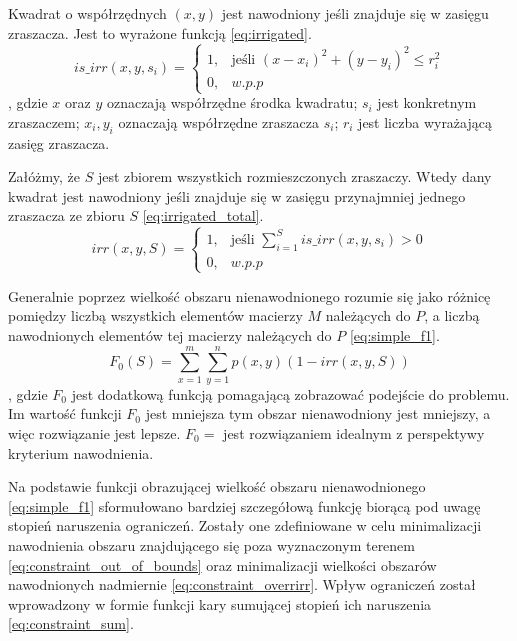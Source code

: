 \documentclass[twoside]{iisthesis}
\begin{document}
Kwadrat o współrzędnych $(x,y)$ jest nawodniony jeśli znajduje się w zasięgu zraszacza. Jest to wyrażone funkcją \eqref{eq:irrigated}.
\begin{equation}\label{eq:irrigated}
	is\_irr(x, y, s_{i}) = \begin{cases}
							1,& \text{jeśli } (x - x_{i})^{2} + (y - y_{i})^2 \leq r_{i}^{2}\\
							0,& w.p.p
						  \end{cases}
\end{equation}
, gdzie $x$ oraz $y$ oznaczają współrzędne środka kwadratu; $s_{i}$ jest konkretnym zraszaczem; $x_{i}, y_{i}$ oznaczają współrzędne zraszacza $s_{i}$; $r_{i}$ jest liczba wyrażającą zasięg zraszacza.

Załóżmy, że $S$ jest zbiorem wszystkich rozmieszczonych zraszaczy. Wtedy dany kwadrat jest nawodniony jeśli znajduje się w zasięgu przynajmniej jednego zraszacza ze zbioru $S$ \eqref{eq:irrigated_total}.
\begin{equation}\label{eq:irrigated_total}
	irr(x, y, S) = \begin{cases}
				   	1,& \text{jeśli } \sum_{i=1}^{S} is\_irr(x,y,s_{i}) > 0 \\
				   	0,& w.p.p			   	
				   \end{cases}
\end{equation}

Generalnie poprzez wielkość obszaru nienawodnionego rozumie się jako różnicę pomiędzy liczbą wszystkich elementów macierzy $M$ należących do $P$, a liczbą nawodnionych elementów tej macierzy należących do $P$ \eqref{eq:simple_f1}.
\begin{equation}\label{eq:simple_f1}
	F_{0}(S) = \sum_{x=1}^{m}\sum_{y=1}^{n} p(x,y)(1 - irr(x,y,S))
\end{equation}
, gdzie $F_{0}$ jest dodatkową funkcją pomagającą zobrazować podejście do problemu. Im wartość funkcji $F_{0}$ jest mniejsza tym obszar nienawodniony jest mniejszy, a więc rozwiązanie jest lepsze. $F_{0} = $ jest rozwiązaniem idealnym z perspektywy kryterium nawodnienia.


Na podstawie funkcji obrazującej wielkość obszaru nienawodnionego \eqref{eq:simple_f1} sformułowano bardziej szczegółową funkcję biorącą pod uwagę stopień naruszenia ograniczeń. Zostały one zdefiniowane w celu minimalizacji nawodnienia obszaru znajdującego się poza wyznaczonym terenem \eqref{eq:constraint_out_of_bounds} oraz minimalizacji wielkości obszarów nawodnionych nadmiernie \eqref{eq:constraint_overrirr}. Wpływ ograniczeń został wprowadzony w formie funkcji kary sumującej stopień ich naruszenia \eqref{eq:constraint_sum}.
\end{document}
